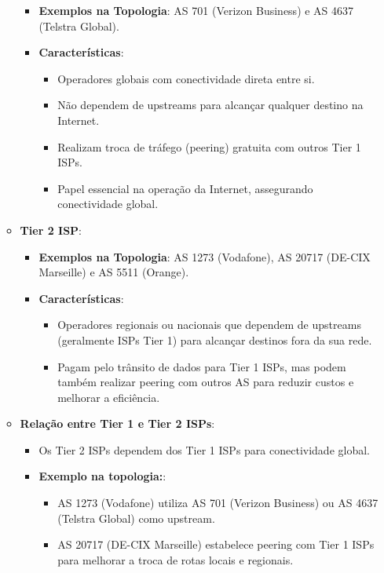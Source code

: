 \documentclass[11pt,english, openright, oneside]{book}
\begin{document}
\begin{enumerate}
\begin{itemize}
    \begin{itemize}
      \item \textbf{Exemplos na Topologia}: AS 701 (Verizon Business) e AS 4637 (Telstra Global).
      \item \textbf{Características}:
      \begin{itemize}
        \item Operadores globais com conectividade direta entre si.
        \item Não dependem de upstreams para alcançar qualquer destino na Internet.
        \item Realizam troca de tráfego (peering) gratuita com outros Tier 1 ISPs.
        \item Papel essencial na operação da Internet, assegurando conectividade global.
      \end{itemize}
    \end{itemize}
    \vspace{0.2cm}

    \newpage
    \item \textbf{Tier 2 ISP}:
    \vspace{0.2cm}
    \begin{itemize}
      \item \textbf{Exemplos na Topologia}: AS 1273 (Vodafone), AS 20717 (DE-CIX Marseille) e AS 5511 (Orange).
      \item \textbf{Características}:
      \begin{itemize}
        \item Operadores regionais ou nacionais que dependem de upstreams (geralmente ISPs Tier 1) para alcançar destinos fora da sua rede.
        \item Pagam pelo trânsito de dados para Tier 1 ISPs, mas podem também realizar peering com outros AS para reduzir custos e melhorar a eficiência.
      \end{itemize}
    \end{itemize}
    \vspace{0.2cm}
    \item \textbf{Relação entre Tier 1 e Tier 2 ISPs}:
    \vspace{0.2cm}
    \begin{itemize}
      \item Os Tier 2 ISPs dependem dos Tier 1 ISPs para conectividade global.
      \item \textbf{Exemplo na topologia:}:
      \begin{itemize}
        \item AS 1273 (Vodafone) utiliza AS 701 (Verizon Business) ou AS 4637 (Telstra Global) como upstream.
        \item AS 20717 (DE-CIX Marseille) estabelece peering com Tier 1 ISPs para melhorar a troca de rotas locais e regionais.
      \end{itemize}
    \end{itemize}
  \end{itemize}
  \vspace{0.2cm}



\end{enumerate}
\end{document}
